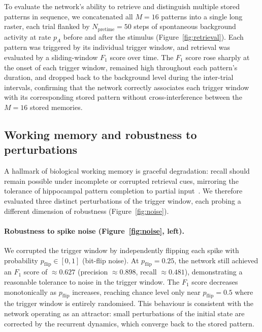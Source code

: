 \documentclass{scrartcl}
\newcommand{\citep}[1]{\parencite{#1}}
\begin{document}
To evaluate the network's ability to retrieve and distinguish multiple stored patterns in sequence, we concatenated all $M=16$ patterns into a single long raster, each trial flanked by $N_\mathrm{pretime}=50$ steps of spontaneous background activity at rate $p_A$ before and after the stimulus (Figure~\ref{fig:retrieval}). Each pattern was triggered by its individual trigger window, and retrieval was evaluated by a sliding-window $F_1$ score over time. The $F_1$ score rose sharply at the onset of each trigger window, remained high throughout each pattern's duration, and dropped back to the background level during the inter-trial intervals, confirming that the network correctly associates each trigger window with its corresponding stored pattern without cross-interference between the $M=16$ stored memories.



\subsection{Working memory and robustness to perturbations}
\label{sec:robustness}
%
A hallmark of biological working memory is graceful degradation: recall should remain possible under incomplete or corrupted retrieval cues, mirroring the tolerance of hippocampal pattern completion to partial input~\citep{Villette2015}. We therefore evaluated three distinct perturbations of the trigger window, each probing a different dimension of robustness (Figure~\ref{fig:noise}).

\paragraph{Robustness to spike noise (Figure~\ref{fig:noise}, left).}
We corrupted the trigger window by independently flipping each spike with probability $p_\mathrm{flip} \in [0, 1]$ (bit-flip noise). At $p_\mathrm{flip} = 0.25$, the network still achieved an $F_1$ score of $\approx 0.627$ (precision $\approx 0.898$, recall $\approx 0.481$), demonstrating a reasonable tolerance to noise in the trigger window. The $F_1$ score decreases monotonically as $p_\mathrm{flip}$ increases, reaching chance level only near $p_\mathrm{flip} = 0.5$ where the trigger window is entirely randomised. This behaviour is consistent with the network operating as an attractor: small perturbations of the initial state are corrected by the recurrent dynamics, which converge back to the stored pattern.
\end{document}
